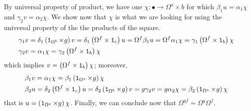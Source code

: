 By universal property of product, we have one \(\chi : \bullet \to \Omega^a \times b\) for which \(\beta_1 u = \alpha_1 \chi\) and \(\gamma_2 v = \alpha_2 \chi\). We show now that \(\chi\) is what we are looking for using the universal property of the the products of the square.
\begin{align*}
& \gamma_1 v = \delta_1 \left( \id_{\Omega^b} \times g \right) v = \delta_1 \left( \Omega^f \times \id_c \right) u = \Omega^f \beta_1 u = \Omega^f \alpha_1 \chi = \gamma_1 \left( \Omega^f \times \id_b \right) \chi \\
& \gamma_2 v = \alpha_1 \chi = \gamma_2 \left( \Omega^f \times \id_b \right) \chi %
\end{align*}
which implies \(v = \left( \Omega^f \times \operatorname{\mathtt 1}_b \right) \chi\); moreover, 
\begin{align*}
& \beta_1 v = \alpha_1 \chi = \beta_1 \left( \operatorname{\mathtt 1}_{\Omega^a} \times g \right) \chi \\
& \beta_2 u = \delta_2 \left( \Omega^f \times \operatorname{\mathtt 1}_c \right) u = \delta_2 \left( \operatorname{\mathtt 1}_{\Omega^b} \times g \right) v = g \gamma_2 v = g \alpha_2 \chi = \beta_2 \left( \operatorname{\mathtt 1}_{\Omega^a} \times g \right) \chi
\end{align*}
that is \(u = \left( \operatorname{\mathtt 1}_{\Omega^a} \times g \right) \chi\). Finally, we can conclude now that \(\Omega^{gf} = \Omega^g \Omega^f\).

